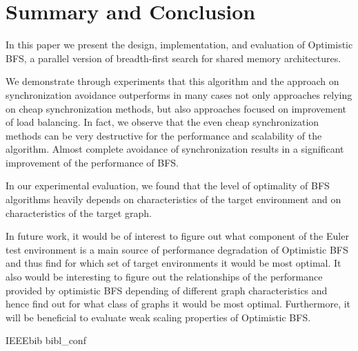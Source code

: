 \documentclass[letterpaper]{article}
\begin{document}
		
		
	\section{Summary and Conclusion}\label{sec:suco} %
		In this paper we present the design, implementation, and evaluation of Optimistic BFS, a parallel version of breadth-first search for shared memory architectures.
		
		We demonstrate through experiments that this algorithm and the approach on synchronization avoidance outperforms in many cases not only approaches relying on cheap synchronization methods, but also approaches focused on improvement of load balancing. 		
		In fact, we observe that the even cheap synchronization methods can be very destructive for the performance and scalability of the algorithm.  
		Almost complete avoidance of synchronization results in a significant improvement of the performance of BFS. %
		
		In our experimental evaluation, we found that the level of optimality of BFS algorithms heavily depends on characteristics of the target environment and on characteristics of the target graph. %
		
		In future work, it would be of interest to figure out what component of the Euler test environment is a main source of performance degradation of Optimistic BFS and thus find for which set of target environments it would be most optimal.  		
		It also would be interesting to figure out the relationships of the performance provided by optimistic BFS depending of different graph characteristics and hence find out for what class of graphs it would be most optimal.
		Furthermore, it will be beneficial to evaluate weak scaling properties of Optimistic BFS.
	
	 	{IEEEbib} %
	 		{bibl_conf}
\end{document}
